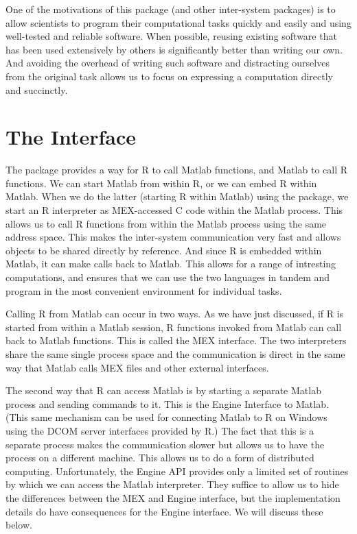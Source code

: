 \documentclass{article}
\begin{document}
One of the motivations of this package (and other inter-system
packages) is to allow scientists to program their computational tasks
quickly and easily and using well-tested and reliable software.  When
possible, reusing existing software that has been used extensively by
others is significantly better than writing our own.  And avoiding the
overhead of writing such software and distracting ourselves from the
original task allows us to focus on expressing a computation directly
and succinctly.


\section{The Interface}
The  package provides a way for R to call Matlab
functions, and Matlab to call R functions.  We can start Matlab from
within R, or we can embed R within Matlab.  When we do the latter
(starting R within Matlab) using the  package, we
start an R interpreter as MEX-accessed C code within the Matlab
process.  This allows us to call R functions from within the Matlab
process using the same address space.  This makes the inter-system
communication very fast and allows objects to be shared directly by
reference.  And since R is embedded within Matlab, it can 
make calls back to Matlab.  This allows for a range of intresting
computations, and ensures that we can use the two languages
in tandem and program in the most convenient environment for
individual tasks.

Calling R from Matlab can occur in two ways.  As we have just
discussed, if R is started from within a Matlab session, R functions
invoked from Matlab can call back to Matlab functions.  This is called
the MEX interface.  The two interpreters share the same single process
space and the communication is direct in the same way that Matlab
calls MEX files and other external interfaces.

The second way that R can access Matlab is by starting a separate
Matlab process and sending commands to it.  This is the Engine
Interface to Matlab. (This same mechanism can be used for connecting
Matlab to R on Windows using the DCOM server interfaces provided by
R.)  The fact that this is a separate process makes the communication
slower but allows us to have the process on a different machine. This
allows us to do a form of distributed computing.  Unfortunately, the
Engine API provides only a limited set of routines by which we can
access the Matlab interpreter.  They suffice to allow us to hide the
differences between the MEX and Engine interface, but the
implementation details do have consequences for the Engine interface.
We will discuss these below.
\end{document}
